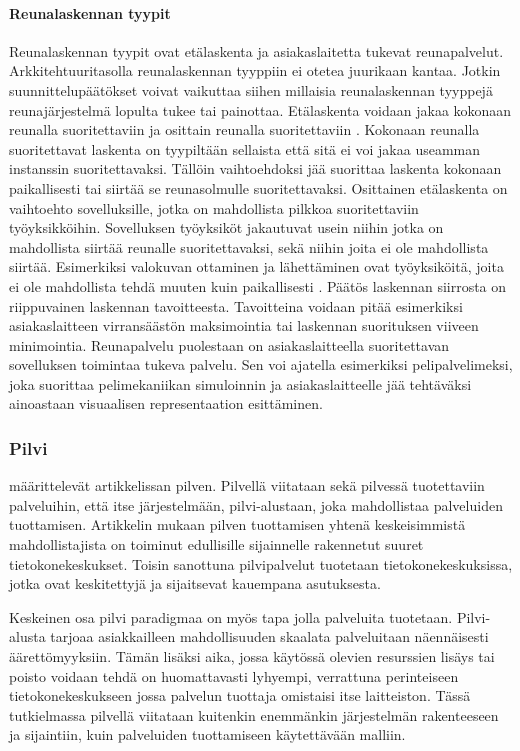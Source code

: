 \paragraph{Reunalaskennan tyypit}
Reunalaskennan tyypit ovat etälaskenta ja asiakaslaitetta tukevat reunapalvelut.
Arkkitehtuuritasolla reunalaskennan tyyppiin ei otetea juurikaan kantaa. 
Jotkin suunnittelupäätökset voivat vaikuttaa siihen millaisia reunalaskennan tyyppejä reunajärjestelmä lopulta tukee tai painottaa.
Etälaskenta voidaan jakaa kokonaan reunalla suoritettaviin ja osittain reunalla suoritettaviin \cite{mach17mobile}.
Kokonaan reunalla suoritettavat laskenta on tyypiltään sellaista että sitä ei voi jakaa useamman instanssin suoritettavaksi.
Tällöin vaihtoehdoksi jää suorittaa laskenta kokonaan paikallisesti tai siirtää se reunasolmulle suoritettavaksi.
Osittainen etälaskenta on vaihtoehto sovelluksille, jotka on mahdollista pilkkoa suoritettaviin työyksikköihin. Sovelluksen työyksiköt jakautuvat usein niihin jotka on mahdollista siirtää reunalle suoritettavaksi, sekä niihin joita ei ole mahdollista siirtää. 
Esimerkiksi valokuvan ottaminen ja lähettäminen ovat työyksiköitä, joita ei ole mahdollista tehdä muuten kuin paikallisesti \cite{mach17mobile}.
Päätös laskennan siirrosta on riippuvainen laskennan tavoitteesta. Tavoitteina voidaan pitää esimerkiksi asiakaslaitteen virransäästön maksimointia tai laskennan suorituksen viiveen minimointia.
Reunapalvelu puolestaan on asiakaslaitteella suoritettavan sovelluksen toimintaa tukeva palvelu. Sen voi ajatella esimerkiksi pelipalvelimeksi, joka suorittaa pelimekaniikan simuloinnin ja asiakaslaitteelle jää tehtäväksi ainoastaan visuaalisen representaation esittäminen.  



\subsubsection{Pilvi}
\cite{armbrust2010view} määrittelevät artikkelissan pilven. 
Pilvellä viitataan sekä pilvessä tuotettaviin palveluihin, että itse järjestelmään, pilvi-alustaan, joka mahdollistaa palveluiden tuottamisen.
Artikkelin mukaan pilven tuottamisen yhtenä keskeisimmistä mahdollistajista on toiminut edullisille sijainnelle rakennetut suuret tietokonekeskukset.
Toisin sanottuna pilvipalvelut tuotetaan tietokonekeskuksissa, jotka ovat keskitettyjä ja sijaitsevat kauempana asutuksesta. 

Keskeinen osa pilvi paradigmaa on myös tapa jolla palveluita tuotetaan.
Pilvi-alusta tarjoaa asiakkailleen mahdollisuuden skaalata palveluitaan näennäisesti äärettömyyksiin.
Tämän lisäksi aika, jossa käytössä olevien resurssien lisäys tai poisto voidaan tehdä on huomattavasti lyhyempi, verrattuna perinteiseen tietokonekeskukseen jossa palvelun tuottaja omistaisi itse laitteiston.
Tässä tutkielmassa pilvellä viitataan kuitenkin enemmänkin järjestelmän rakenteeseen ja sijaintiin, kuin palveluiden tuottamiseen käytettävään malliin.

